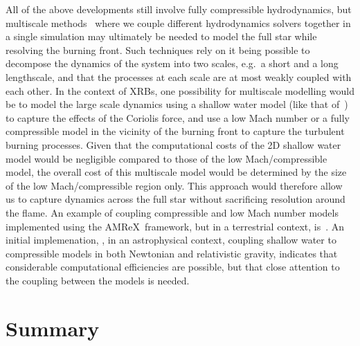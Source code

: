 \documentclass[a4paper]{jpconf}
\newcommand{\amrex}{{\sffamily AMReX}}
\newcommand{\MarginPar}[1]{\marginpar{\vskip-\baselineskip\raggedright\tiny\sffamily\hrule\smallskip{\color{red}#1}\par\smallskip\hrule}}
\begin{document}
All of the above developments still involve fully compressible
hydrodynamics, but multiscale methods~\cite{weinan2011principles} where we couple different hydrodynamics
solvers together in a single simulation may ultimately be needed to model the full star while resolving the burning front.
Such techniques rely on it being possible to decompose the dynamics of the system
into two scales, e.g.~a short and a long lengthscale, and that the processes at each
scale are at most weakly coupled with each other. In the context of XRBs, one possibility for
multiscale modelling would be to model the large scale dynamics using a shallow water model
(like that of~\cite{SPIT_ETAL02}) to capture the effects of the Coriolis force, and use
a low Mach number or
a fully compressible model in the vicinity of the burning front to capture
the turbulent burning processes. Given that the computational costs of the 2D shallow water model
would be negligible compared to those of the low Mach/compressible model, the overall cost of
this multiscale model would be determined by the size of the low Mach/compressible region only. This
approach would therefore allow us to capture dynamics across the full star
without sacrificing resolution around the flame.
An example of coupling compressible and low Mach number models implemented using the \amrex~framework, but in a terrestrial context,
is~\cite{Motheau2018}. An initial implemenation, \cite{Harpole2018}, in an
astrophysical context, coupling shallow water to compressible models in both
Newtonian and relativistic gravity, indicates that considerable computational
efficiencies are possible, but that close attention to the coupling between the
models is needed.



\section{Summary}
\end{document}
